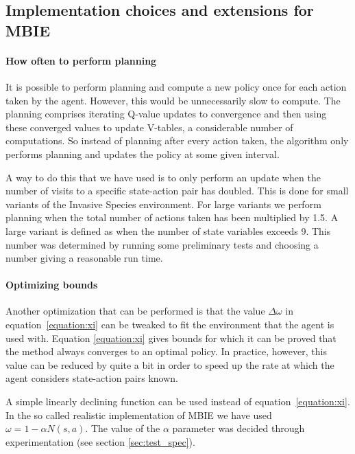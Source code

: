 \subsection{Implementation choices and extensions for MBIE}
\label{sec:MBIE_our_contribution}

\paragraph{How often to perform planning}
\label{sec:mbie_perform_planning}

It is possible to perform planning and compute a new policy once for each
action taken by the agent. However, this would be unnecessarily slow to
compute. The planning comprises iterating Q-value updates to convergence and
then using these converged values to update V-tables, a considerable number of
computations. So instead of planning after every action taken, the algorithm
only performs planning and updates the policy at some given interval. 

A way to do this that we have used is to only perform an update when the number 
of visits to a specific state-action pair has doubled. This is
done for small variants of the Invasive Species environment. For large variants
we perform planning when the total number of actions taken has been multiplied
by 1.5. A large variant is defined as when the number of state variables
exceeds 9. This number was determined by running some preliminary tests and
choosing a number giving a reasonable run time.

\paragraph{Optimizing bounds}

Another optimization that can be performed is that the value $\Delta \omega$ in
equation~\eqref{equation:xi} can be tweaked to fit the environment that the
agent is used with. Equation \eqref{equation:xi} gives bounds for which it can
be proved that the method always converges to an optimal policy. In practice,
however, this value can be reduced by quite a bit in order to speed up the rate
at which the agent considers state-action pairs known. 

A simple linearly declining function can be used instead of
equation~\eqref{equation:xi}. In the so called realistic implementation of MBIE we have
used $\omega = 1 - \alpha N(s,a).$ The value of the $\alpha$ parameter was decided through experimentation (see section \ref{sec:test_spec}).

